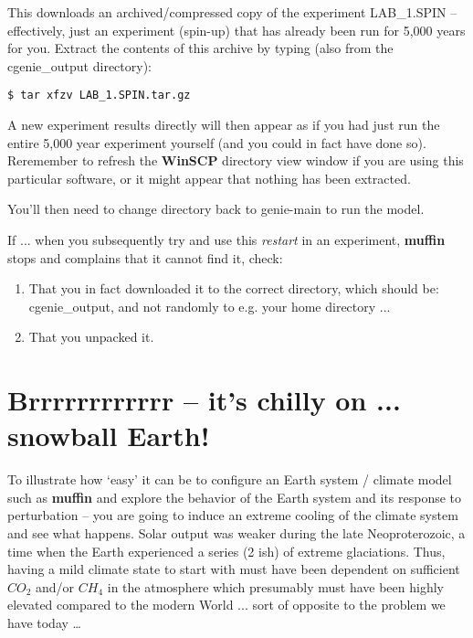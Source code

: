 \documentclass[11pt,fleqn]{book} %
\begin{document}
This downloads an archived/compressed copy of the experiment \textsf{\footnotesize LAB\_1.SPIN} – effectively, just an experiment (spin-up) that has already been run for 5,000 years for you. Extract the contents of this archive by typing (also from the \textsf{\footnotesize cgenie\_output} directory):
\vspace{-2mm}
\begin{verbatim}
$ tar xfzv LAB_1.SPIN.tar.gz
\end{verbatim}
\vspace{-2mm}

A new experiment results directly will then appear as if you had just run the entire 5,000 year experiment yourself (and you could in fact have done so). Reremember to refresh the \textbf{WinSCP} directory view window if you are using this particular software, or it might appear that nothing has been extracted.

You’ll then need to change directory back to \textsf{\footnotesize genie-main} to run the model.

\vspace{1mm}
If ... when you subsequently try and use this \textit{restart} in an experiment, \textbf{muffin} stops and complains that it cannot find it, check:
\begin{enumerate}[noitemsep]
\item That you in fact downloaded it to the correct directory, which should be: \textsf{\footnotesize cgenie\_output}, and not randomly to e.g. your home directory ...
\item That you unpacked it.
\end{enumerate}


\newpage


\section{Brrrrrrrrrrrr – it’s chilly on ... snowball Earth!}

To illustrate how ‘easy’ it can be to configure an Earth system / climate model such as \textbf{muffin} and explore the behavior of the Earth system and its response to perturbation – you are going to induce an extreme cooling of the climate system and see what happens. Solar output was weaker during the late Neoproterozoic, a time when the Earth experienced a series (2 ish) of extreme glaciations. Thus, having a mild climate state to start with must have been dependent on sufficient \(CO_{2}\) and/or \(CH_{4}\) in the atmosphere which presumably must have been highly elevated compared to the modern World ... sort of opposite to the problem we have today …
\end{document}
